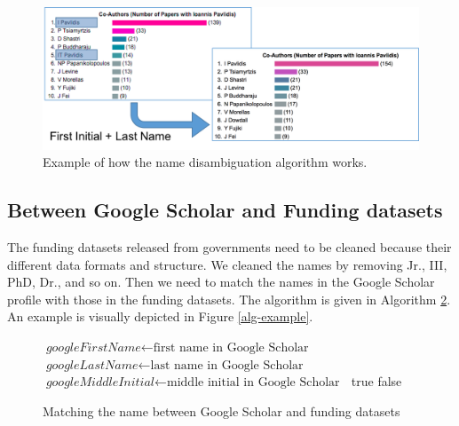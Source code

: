 \begin{figure}[H]
\begin{center}
  \includegraphics[width=.9\textwidth]{figures/fig-name-dis-example1}
\caption{Example of how the name disambiguation algorithm works.}
\label{default}
\end{center}
\end{figure}




\subsection{Between Google Scholar and Funding datasets}

The funding datasets released from governments need to be cleaned because their different data formats and structure. We cleaned the names by removing Jr., III, PhD, Dr., and so on. Then we need to match the names in the Google Scholar profile with those in the funding datasets. The algorithm is given in Algorithm \ref{algorithm}. An example is visually depicted in Figure \ref{alg-example}.

\begin{figure}
\begin{algorithm}[H]
\caption{Matching the name between Google Scholar and funding datasets}
\begin{algorithmic}[1]
\State $\textit{googleFirstName} \gets \text{first name in Google Scholar }$
\State $\textit{googleLastName} \gets \text{last name in Google Scholar }$
\State $\textit{googleMiddleInitial} \gets \text{middle initial in Google Scholar }$
{\Return true}
\EndIf
\EndIf
\EndIf
\Return false
\EndProcedure
\label{algorithm}
\end{algorithmic}
\end{algorithm}
\end{figure}




